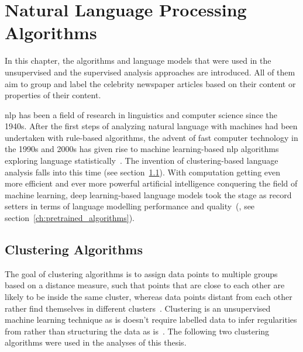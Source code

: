 \renewcommand{\imagepath}{../30-algorithms/img}

\chapter{Natural Language Processing Algorithms}\label{ch:algorithms}
In this chapter, the algorithms and language models that were used in the unsupervised and the supervised analysis approaches are introduced. All of them aim to group and label the celebrity newspaper articles based on their content or properties of their content.


\gls{nlp} has been a field of research in linguistics and computer science since the 1940s. After the first steps of analyzing natural language with machines had been undertaken with rule-based algorithms, the advent of fast computer technology in the 1990s and 2000s has given rise to machine learning-based \gls{nlp} algorithms exploring language statistically~\autocite{jurafsky_speech_2008}. The invention of clustering-based language analysis falls into this time (see section~\ref{ch:clustering_algorithms}). With computation getting even more efficient and ever more powerful artificial intelligence conquering the field of machine learning, deep learning-based language models took the stage as record setters in terms of language modelling performance and quality~(\cite{vajjala_practical_2020}, see section~\ref{ch:pretrained_algorithms}).


\section{Clustering Algorithms}\label{ch:clustering_algorithms}
The goal of clustering algorithms is to assign data points to multiple groups based on a distance measure, such that points that are close to each other are likely to be inside the same cluster, whereas data points distant from each other rather find themselves in different clusters~\autocite{everitt_cluster_2011,jain_algorithms_1988}. Clustering is an unsupervised machine learning technique as is doesn't require labelled data to infer regularities from rather than structuring the data as is~\autocite{xu_survey_2005}. The following two clustering algorithms were used in the analyses of this thesis.

